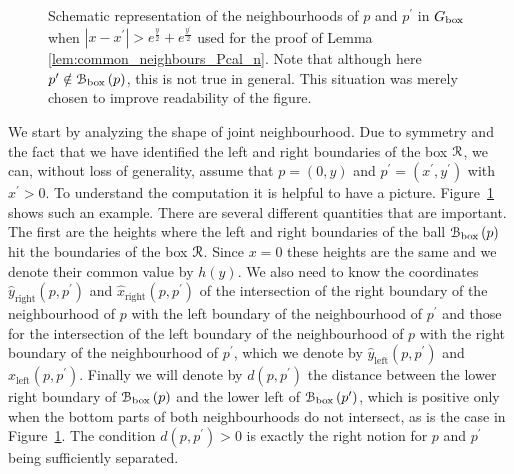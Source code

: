 \begin{figure}[!ht]
\caption{Schematic representation of the neighbourhoods of $p$ and $p^\prime$ in $G_{\mathrm{box}}$ when $|x - x^\prime| > e^{\frac{y}{2}} + e^{\frac{y^\prime}{2}}$ used for the proof of Lemma \ref{lem:common_neighbours_Pcal_n}. Note that although here $p^\prime \notin {\mathcal B}_{\text{box}}\left(p\right)$, this is not true in general. This situation was merely chosen to improve readability of the figure.}
\label{fig:representation_disjoint_neighbourhoods_P_n_3}
\end{figure}


We start by analyzing the shape of joint neighbourhood. Due to symmetry and the fact that we have identified the left and right boundaries of the box ${\mathcal R}$, we can, without loss of generality, assume that $p = (0,y)$ and $p^\prime = (x^\prime,y^\prime)$ with $x^\prime > 0$. To understand the computation it is helpful to have a picture. Figure~\ref{fig:representation_disjoint_neighbourhoods_P_n_3} shows such an example. There are several different quantities that are important. The first are the heights where the left and right boundaries of the ball ${\mathcal B}_{\text{box}}\left(p\right)$ hit the boundaries of the box ${\mathcal R}$. Since $x = 0$ these heights are the same and we denote their common value by $h(y)$. We also need to know the coordinates $\hat{y}_{\text{right}}(p,p^\prime)$ and $\hat{x}_{\text{right}}(p,p^\prime)$ of the intersection of the right boundary of the neighbourhood of $p$ with the left boundary of the neighbourhood of $p^\prime$ and those for the intersection of the left boundary of the neighbourhood of $p$ with the right boundary of the neighbourhood of $p^\prime$, which we denote by $\hat{y}_{\text{left}}(p,p^\prime)$ and $\hat{x}_{\text{left}}(p,p^\prime)$. Finally we will denote by $d(p,p^\prime)$ the distance between the lower right boundary of ${\mathcal B}_{\text{box}}\left(p\right)$ and the lower left of ${\mathcal B}_{\text{box}}\left(p^\prime\right)$, which is positive only when the bottom parts of both neighbourhoods do not intersect, as is the case in Figure~\ref{fig:representation_disjoint_neighbourhoods_P_n_3}. The condition $d(p,p^\prime) > 0$ is exactly the right notion for $p$ and $p^\prime$ being sufficiently separated.


